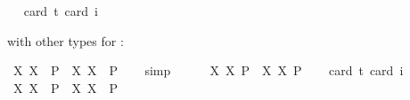 \begin{isabellebody}
\ \ \isamarkupfalse%
{\isacharbrackleft}card\ {\isacharprime}t{\isacharequal}{}{\isacharcomma}\ card\ i{\isacharequal}{}{\isacharbrackright}%
\isadelimproof
\ %
\endisadelimproof
%
\isatagproof
{}\isamarkupfalse%
\ %
%
\endisatagproof
{\isafoldproof}%
%
\isadelimproof
%
\endisadelimproof
%
\begin{isamarkuptext}%
with other types for :%
\end{isamarkuptext}\isamarkuptrue%
\isamarkupfalse%
\ {\isachardoublequoteopen}{\isasymlfloor}{\isacharparenleft}{\isasymlambda}X{\isachardot}\ \isactrlbold {\isasymdiamond}\isactrlbold {\isasymexists}X{\isacharparenright}\ \ {\isacharparenleft}P{\isacharcolon}{\isacharcolon}{\isasymup}{\isasymlangle}{\isasymup}{\isasymzero}{\isasymrangle}{\isacharparenright}\ \isactrlbold {\isasymrightarrow}\ \isactrlbold {\isasymdiamond}{\isacharparenleft}{\isacharparenleft}{\isasymlambda}X{\isachardot}\ \isactrlbold {\isasymexists}X{\isacharparenright}\ \ P{\isacharparenright}{\isasymrfloor}{\isachardoublequoteclose}%
\isadelimproof
\ \ %
\endisadelimproof
%
\isatagproof
{}\isamarkupfalse%
\ simp%
\endisatagproof
{\isafoldproof}%
%
\isadelimproof
%
\endisadelimproof
\ \ \ \ \isanewline
{}\isamarkupfalse%
\ {\isachardoublequoteopen}{\isasymlfloor}{\isacharparenleft}{\isasymlambda}X{\isachardot}\ \isactrlbold {\isasymdiamond}\isactrlbold {\isasymexists}X{\isacharparenright}\ \isactrlbold {\isasymdown}{\isacharparenleft}P{\isacharcolon}{\isacharcolon}{\isasymup}{\isasymlangle}{\isasymup}{\isasymzero}{\isasymrangle}{\isacharparenright}\ \isactrlbold {\isasymrightarrow}\ \isactrlbold {\isasymdiamond}{\isacharparenleft}{\isacharparenleft}{\isasymlambda}X{\isachardot}\ \isactrlbold {\isasymexists}X{\isacharparenright}\ \isactrlbold {\isasymdown}P{\isacharparenright}{\isasymrfloor}{\isachardoublequoteclose}\ \isanewline
\ \ \isamarkupfalse%
{\isacharbrackleft}card\ {\isacharprime}t{\isacharequal}{}{\isacharcomma}\ card\ i{\isacharequal}{}{\isacharbrackright}%
\isadelimproof
\ %
\endisadelimproof
%
\isatagproof
{}\isamarkupfalse%
\ %
%
\endisatagproof
{\isafoldproof}%
%
\isadelimproof
%
\endisadelimproof
\isanewline
{}\isamarkupfalse%
\ {\isachardoublequoteopen}{\isasymlfloor}{\isacharparenleft}{\isasymlambda}X{\isachardot}\ \isactrlbold {\isasymdiamond}\isactrlbold {\isasymexists}X{\isacharparenright}\ \ {\isacharparenleft}P{\isacharcolon}{\isacharcolon}{\isasymup}{\isasymlangle}{\isasymlangle}{\isasymzero}{\isasymrangle}{\isasymrangle}{\isacharparenright}\ \isactrlbold {\isasymrightarrow}\ \isactrlbold {\isasymdiamond}{\isacharparenleft}{\isacharparenleft}{\isasymlambda}X{\isachardot}\ \isactrlbold {\isasymexists}X{\isacharparenright}\ \ P{\isacharparenright}{\isasymrfloor}{\isachardoublequoteclose}%

\end{isabellebody}
